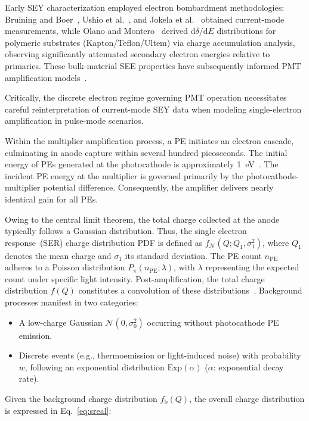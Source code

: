 Early SEY characterization employed electron bombardment methodologies: Bruining and Boer~\cite{1938Secondary}, Ushio et al.~\cite{1988Secondary}, and Jokela et al.~\cite{2012Secondary} obtained current-mode measurements, while Olano and Montero~\cite{OLANO2020103456} derived $\mathrm{d}\delta/\mathrm{d}E$ distributions for polymeric substrates (Kapton/Teflon/Ultem) via charge accumulation analysis, observing significantly attenuated secondary electron energies relative to primaries. These bulk-material SEE properties have subsequently informed PMT amplification models~\cite{2012An,2021Effects}.

Critically, the discrete electron regime governing PMT operation necessitates careful reinterpretation of current-mode SEY data when modeling single-electron amplification in pulse-mode scenarios.

Within the multiplier amplification process, a PE initiates an electron cascade, culminating in anode capture within several hundred picoseconds. The initial energy of PEs generated at the photocathode is approximately \SI{1}{eV}~\cite{Nathan1970TheED}. The incident PE energy at the multiplier is governed primarily by the photocathode-multiplier potential difference. Consequently, the amplifier delivers nearly identical gain for all PEs.

Owing to the central limit theorem, the total charge collected at the anode typically follows a Gaussian distribution. Thus, the single electron response~(SER) charge distribution PDF is defined as $ f_{\mathcal{N}}(Q; Q_1,\sigma_1^2) $, where $ Q_1 $ denotes the mean charge and $ \sigma_1 $ its standard deviation. The PE count $ n_{\mathrm{PE}} $ adheres to a Poisson distribution $ P_\pi(n_{\mathrm{PE}};\lambda) $, with $ \lambda $ representing the expected count under specific light intensity. Post-amplification, the total charge distribution $ f(Q) $ constitutes a convolution of these distributions~\cite{1994Absolute}. Background processes manifest in two categories:
\begin{itemize}
	\item A low-charge Gaussian $ \mathcal{N}(0,\sigma_0^2) $ occurring without photocathode PE emission.
	\item Discrete events (e.g., thermoemission or light-induced noise) with probability $ w $, following an exponential distribution $ \mathrm{Exp}(\alpha) $ ($\alpha$: exponential decay rate).
\end{itemize}

Given the background charge distribution $ f_{\mathrm{b}}(Q) $, the overall charge distribution is expressed in Eq.~\ref{eq:sreal}:

